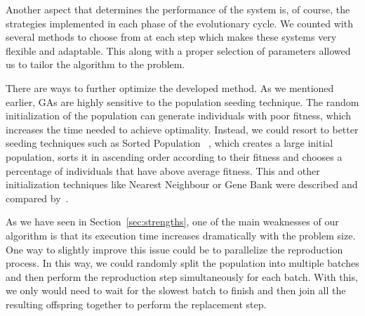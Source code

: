 \documentclass[anon]{CI}
\begin{document}
Another aspect that determines the performance of the system is, of course, the strategies implemented in each phase of the evolutionary cycle. We counted with several methods to choose from at each step which makes these systems very flexible and adaptable. This along with a proper selection of parameters allowed us to tailor the algorithm to the problem.

There are ways to further optimize the developed method. As we mentioned earlier, GAs are highly sensitive to the population seeding technique. The random initialization of the population can generate individuals with poor fitness, which increases the time needed to achieve optimality. Instead, we could resort to better seeding techniques such as Sorted Population ~\cite{yugay2008hybrid}, which creates a large initial population, sorts it in ascending order according to their fitness and chooses a percentage of individuals that have above average fitness. This and other initialization techniques like Nearest Neighbour or Gene Bank were described and compared by~\cite{hassanat2018improved}.

As we have seen in Section~\ref{sec:strengths}, one of the main weaknesses of our algorithm is that its execution time increases dramatically with the problem size. One way to slightly improve this issue could be to parallelize the reproduction process. In this way, we could randomly split the population into multiple batches and then perform the reproduction step simultaneously for each batch. With this, we only would need to wait for the slowest batch to finish and then join all the resulting offspring together to perform the replacement step.


\clearpage


\end{document}
